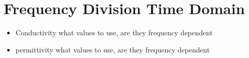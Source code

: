 \section{Frequency Division Time Domain}
\label{sec:fdtd}


\begin{itemize}
\item Conductivity what values to use, are they frequency dependent
\item permittivity what values to use, are they frequency dependent
\end{itemize}
